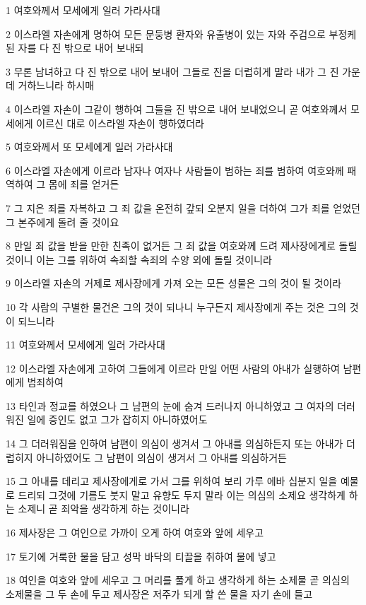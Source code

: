 \par 1 여호와께서 모세에게 일러 가라사대
\par 2 이스라엘 자손에게 명하여 모든 문둥병 환자와 유출병이 있는 자와 주검으로 부정케 된 자를 다 진 밖으로 내어 보내되
\par 3 무론 남녀하고 다 진 밖으로 내어 보내어 그들로 진을 더럽히게 말라 내가 그 진 가운데 거하느니라 하시매
\par 4 이스라엘 자손이 그같이 행하여 그들을 진 밖으로 내어 보내었으니 곧 여호와께서 모세에게 이르신 대로 이스라엘 자손이 행하였더라
\par 5 여호와께서 또 모세에게 일러 가라사대
\par 6 이스라엘 자손에게 이르라 남자나 여자나 사람들이 범하는 죄를 범하여 여호와께 패역하여 그 몸에 죄를 얻거든
\par 7 그 지은 죄를 자복하고 그 죄 값을 온전히 갚되 오분지 일을 더하여 그가 죄를 얻었던 그 본주에게 돌려 줄 것이요
\par 8 만일 죄 값을 받을 만한 친족이 없거든 그 죄 값을 여호와께 드려 제사장에게로 돌릴 것이니 이는 그를 위하여 속죄할 속죄의 수양 외에 돌릴 것이니라
\par 9 이스라엘 자손의 거제로 제사장에게 가져 오는 모든 성물은 그의 것이 될 것이라
\par 10 각 사람의 구별한 물건은 그의 것이 되나니 누구든지 제사장에게 주는 것은 그의 것이 되느니라
\par 11 여호와께서 모세에게 일러 가라사대
\par 12 이스라엘 자손에게 고하여 그들에게 이르라 만일 어떤 사람의 아내가 실행하여 남편에게 범죄하여
\par 13 타인과 정교를 하였으나 그 남편의 눈에 숨겨 드러나지 아니하였고 그 여자의 더러워진 일에 증인도 없고 그가 잡히지 아니하였어도
\par 14 그 더러워짐을 인하여 남편이 의심이 생겨서 그 아내를 의심하든지 또는 아내가 더럽히지 아니하였어도 그 남편이 의심이 생겨서 그 아내를 의심하거든
\par 15 그 아내를 데리고 제사장에게로 가서 그를 위하여 보리 가루 에바 십분지 일을 예물로 드리되 그것에 기름도 붓지 말고 유향도 두지 말라 이는 의심의 소제요 생각하게 하는 소제니 곧 죄악을 생각하게 하는 것이니라
\par 16 제사장은 그 여인으로 가까이 오게 하여 여호와 앞에 세우고
\par 17 토기에 거룩한 물을 담고 성막 바닥의 티끌을 취하여 물에 넣고
\par 18 여인을 여호와 앞에 세우고 그 머리를 풀게 하고 생각하게 하는 소제물 곧 의심의 소제물을 그 두 손에 두고 제사장은 저주가 되게 할 쓴 물을 자기 손에 들고

